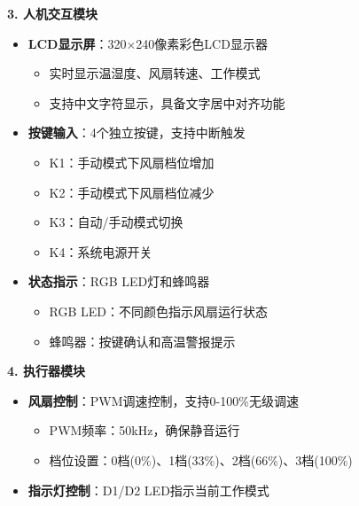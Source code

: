 \textbf{3. 人机交互模块}
\begin{itemize}
    \vspace{-6pt}
  \item \textbf{LCD显示屏}：320×240像素彩色LCD显示器
    \begin{itemize}
        \vspace{-3pt}
      \item 实时显示温湿度、风扇转速、工作模式
        \vspace{-3pt}
      \item 支持中文字符显示，具备文字居中对齐功能
    \end{itemize}
    \vspace{-6pt}
  \item \textbf{按键输入}：4个独立按键，支持中断触发
    \begin{itemize}
        \vspace{-3pt}
      \item K1：手动模式下风扇档位增加
        \vspace{-3pt}
      \item K2：手动模式下风扇档位减少
        \vspace{-3pt}
      \item K3：自动/手动模式切换
        \vspace{-3pt}
      \item K4：系统电源开关
    \end{itemize}
    \vspace{-6pt}
  \item \textbf{状态指示}：RGB LED灯和蜂鸣器
    \begin{itemize}
        \vspace{-3pt}
      \item RGB LED：不同颜色指示风扇运行状态
        \vspace{-3pt}
      \item 蜂鸣器：按键确认和高温警报提示
    \end{itemize}
\end{itemize}

\textbf{4. 执行器模块}
\begin{itemize}
    \vspace{-6pt}
  \item \textbf{风扇控制}：PWM调速控制，支持0-100\%无级调速
    \begin{itemize}
        \vspace{-3pt}
      \item PWM频率：50kHz，确保静音运行
        \vspace{-3pt}
      \item 档位设置：0档(0\%)、1档(33\%)、2档(66\%)、3档(100\%)
    \end{itemize}
    \vspace{-6pt}
  \item \textbf{指示灯控制}：D1/D2 LED指示当前工作模式
\end{itemize}

